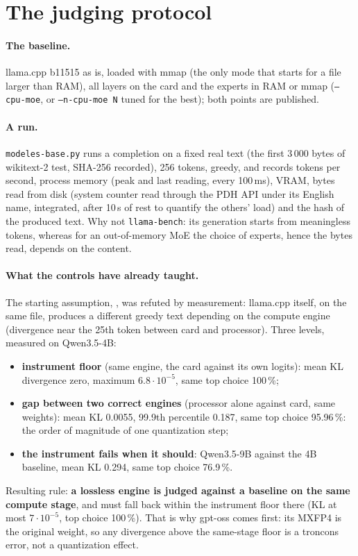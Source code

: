 \section{The judging protocol}\label{sec:protocole-jugement}

\paragraph{The baseline.} llama.cpp b11515 as is, loaded with mmap (the only mode that starts for a file larger than RAM), all layers on the card and the experts in RAM or mmap (\texttt{--cpu-moe}, or \texttt{--n-cpu-moe N} tuned for the best); both points are published.

\paragraph{A run.} \texttt{modeles-base.py} runs a completion on a fixed real text (the first 3\,000 bytes of wikitext-2 test, SHA-256 recorded), 256 tokens, greedy, and records tokens per second, process memory (peak and last reading, every 100\,ms), VRAM, bytes read from disk (system counter read through the PDH API under its English name, integrated, after 10\,s of rest to quantify the others' load) and the hash of the produced text. Why not \texttt{llama-bench}: its generation starts from meaningless tokens, whereas for an out-of-memory MoE the choice of experts, hence the bytes read, depends on the content.

\paragraph{What the controls have already taught.} The starting assumption, , was refuted by measurement: llama.cpp itself, on the same file, produces a different greedy text depending on the compute engine (divergence near the 25th token between card and processor). Three levels, measured on Qwen3.5-4B:
\begin{itemize}
\item \textbf{instrument floor} (same engine, the card against its own logits): mean KL divergence zero, maximum $6.8\cdot10^{-5}$, same top choice 100\,\%;
\item \textbf{gap between two correct engines} (processor alone against card, same weights): mean KL 0.0055, 99.9th percentile 0.187, same top choice 95.96\,\%: the order of magnitude of one quantization step;
\item \textbf{the instrument fails when it should}: Qwen3.5-9B against the 4B baseline, mean KL 0.294, same top choice 76.9\,\%.
\end{itemize}
Resulting rule: \textbf{a lossless engine is judged against a baseline on the same compute stage}, and must fall back within the instrument floor there (KL at most $7\cdot10^{-5}$, top choice 100\,\%). That is why gpt-oss comes first: its MXFP4 is the original weight, so any divergence above the same-stage floor is a troncons error, not a quantization effect.


